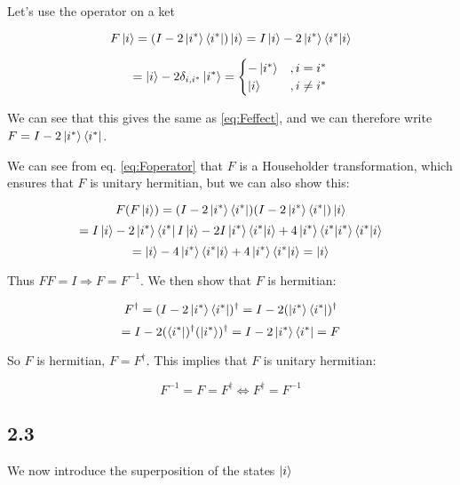 \documentclass[a4paper,norsk, 10pt]{article}
\begin{document}
Let's use the operator on a ket

\begin{equation}
F\ket{i} = (I - 2\ket{i^*}\bra{i^*})\ket{i} = I\ket{i} - 2\ket{i^*}\bra{i^*}\ket{i}
\end{equation}

\begin{equation}
= \ket{i} - 2\delta_{i,i^*}\ket{i^*} =
\begin{cases}
-\ket{i^*} & , i = i^* \\
\ket{i} & , i \neq i^*
\end{cases}
\end{equation}

We can see that this gives the same as \eqref{eq:Feffect}, and we can therefore write $F = I - 2\ket{i^*}\bra{i^*}$.

We can see from eq. \ref{eq:Foperator} that $F$ is a Householder transformation, which ensures that $F$ is unitary hermitian, but we can also show this:

\begin{equation}
F(F\ket{i}) = (I - 2\ket{i^*}\bra{i^*})(I - 2\ket{i^*}\bra{i^*})\ket{i}
\end{equation}
\begin{equation}
= I\ket{i} - 2\ket{i^*}\bra{i^*}I\ket{i} -2I\ket{i^*}\bra{i^*}\ket{i} + 4\ket{i^*}\bra{i^*}\ket{i^*}\bra{i^*}\ket{i}
\end{equation}
\begin{equation}
= \ket{i} - 4\ket{i^*}\bra{i^*}\ket{i} + 4\ket{i^*}\bra{i^*}\ket{i} = \ket{i}
\end{equation}

Thus $FF = I \Rightarrow F = F^{-1}$. We then show that $F$ is hermitian:

\begin{equation}
F^\dagger = (I - 2\ket{i^*}\bra{i^*})^\dagger = I - 2(\ket{i^*}\bra{i^*})^\dagger
\end{equation}
\begin{equation}
= I - 2(\bra{i^*})^\dagger(\ket{i^*})^\dagger = I - 2\ket{i^*}\bra{i^*} = F
\end{equation}

So $F$ is hermitian, $F = F^\dagger$. This implies that $F$ is unitary hermitian:

\begin{equation}
F^{-1} = F = F^\dagger \Leftrightarrow F^\dagger = F^{-1}
\end{equation}


\subsection{2.3}
We now introduce the superposition of the states $\ket{i}$
\end{document}
